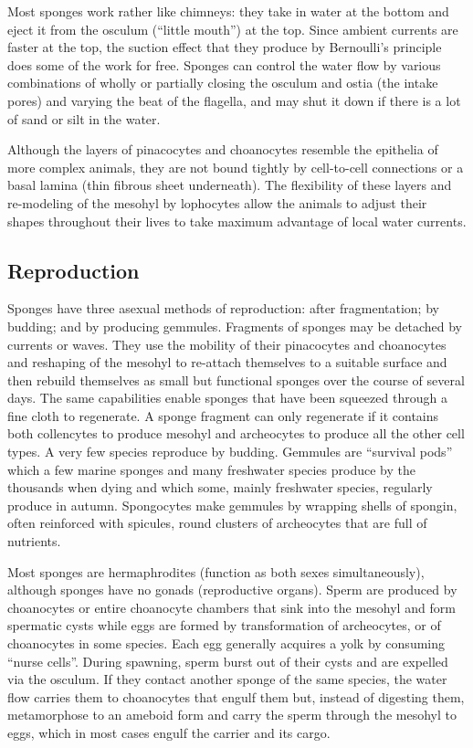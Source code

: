 Most sponges work rather like chimneys: they take in water at the bottom
and eject it from the osculum (``little mouth'') at the top. Since
ambient currents are faster at the top, the suction effect that they
produce by Bernoulli's principle does some of the work for free. Sponges
can control the water flow by various combinations of wholly or
partially closing the osculum and ostia (the intake pores) and varying
the beat of the flagella, and may shut it down if there is a lot of sand
or silt in the water.

Although the layers of pinacocytes and choanocytes resemble the
epithelia of more complex animals, they are not bound tightly by
cell-to-cell connections or a basal lamina (thin fibrous sheet
underneath). The flexibility of these layers and re-modeling of the
mesohyl by lophocytes allow the animals to adjust their shapes
throughout their lives to take maximum advantage of local water
currents.

\subsection{Reproduction}\label{reproduction-1}

Sponges have three asexual methods of reproduction: after fragmentation;
by budding; and by producing gemmules. Fragments of sponges may be
detached by currents or waves. They use the mobility of their
pinacocytes and choanocytes and reshaping of the mesohyl to re-attach
themselves to a suitable surface and then rebuild themselves as small
but functional sponges over the course of several days. The same
capabilities enable sponges that have been squeezed through a fine cloth
to regenerate. A sponge fragment can only regenerate if it contains both
collencytes to produce mesohyl and archeocytes to produce all the other
cell types. A very few species reproduce by budding. Gemmules are
``survival pods'' which a few marine sponges and many freshwater species
produce by the thousands when dying and which some, mainly freshwater
species, regularly produce in autumn. Spongocytes make gemmules by
wrapping shells of spongin, often reinforced with spicules, round
clusters of archeocytes that are full of nutrients.

Most sponges are hermaphrodites (function as both sexes simultaneously),
although sponges have no gonads (reproductive organs). Sperm are
produced by choanocytes or entire choanocyte chambers that sink into the
mesohyl and form spermatic cysts while eggs are formed by transformation
of archeocytes, or of choanocytes in some species. Each egg generally
acquires a yolk by consuming ``nurse cells''. During spawning, sperm
burst out of their cysts and are expelled via the osculum. If they
contact another sponge of the same species, the water flow carries them
to choanocytes that engulf them but, instead of digesting them,
metamorphose to an ameboid form and carry the sperm through the mesohyl
to eggs, which in most cases engulf the carrier and its cargo.

